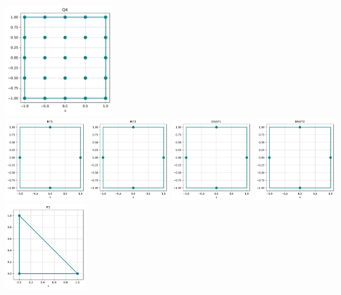 \begin{center}
\includegraphics[width=4cm]{python_codes/fieldstone_120/spaces/Q4_nodes}\\
\includegraphics[width=3cm]{python_codes/fieldstone_120/spaces/RT1_nodes}
\includegraphics[width=3cm]{python_codes/fieldstone_120/spaces/RT2_nodes}
\includegraphics[width=3cm]{python_codes/fieldstone_120/spaces/DSSY1_nodes}
\includegraphics[width=3cm]{python_codes/fieldstone_120/spaces/DSSY2_nodes}\\
\includegraphics[width=3cm]{python_codes/fieldstone_120/spaces/P1_nodes}

\end{center}
